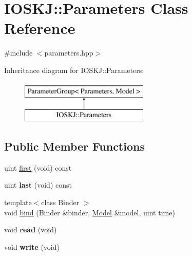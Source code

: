 \hypertarget{classIOSKJ_1_1Parameters}{\section{I\-O\-S\-K\-J\-:\-:Parameters Class Reference}
\label{classIOSKJ_1_1Parameters}
}


{\ttfamily \#include $<$parameters.\-hpp$>$}

Inheritance diagram for I\-O\-S\-K\-J\-:\-:Parameters\-:\begin{figure}[H]
\begin{center}
\leavevmode
\includegraphics[height=2.000000cm]{classIOSKJ_1_1Parameters}
\end{center}
\end{figure}
\subsection*{Public Member Functions}
\begin{DoxyCompactItemize}
\item 
uint \hyperlink{classIOSKJ_1_1Parameters_a92333cb837e763080f8ebf1ea569f5fe}{first} (void) const 
\item 
\hypertarget{classIOSKJ_1_1Parameters_a7a3a67c846eec0ccff2f2cae7e918bf3}{uint {\bfseries last} (void) const }\label{classIOSKJ_1_1Parameters_a7a3a67c846eec0ccff2f2cae7e918bf3}

\item 
{\footnotesize template$<$class Binder $>$ }\\void \hyperlink{classIOSKJ_1_1Parameters_a35b3ba97ccdeb6a8d49165488d658dcd}{bind} (Binder \&binder, \hyperlink{classIOSKJ_1_1Model}{Model} \&model, uint time)
\item 
\hypertarget{classIOSKJ_1_1Parameters_aff07d5cc2d78f10a74c19a1c428beb40}{void {\bfseries read} (void)}\label{classIOSKJ_1_1Parameters_aff07d5cc2d78f10a74c19a1c428beb40}

\item 
\hypertarget{classIOSKJ_1_1Parameters_a9772edd2980c23d53def81e2bce651f3}{void {\bfseries write} (void)}\label{classIOSKJ_1_1Parameters_a9772edd2980c23d53def81e2bce651f3}

\end{DoxyCompactItemize}
